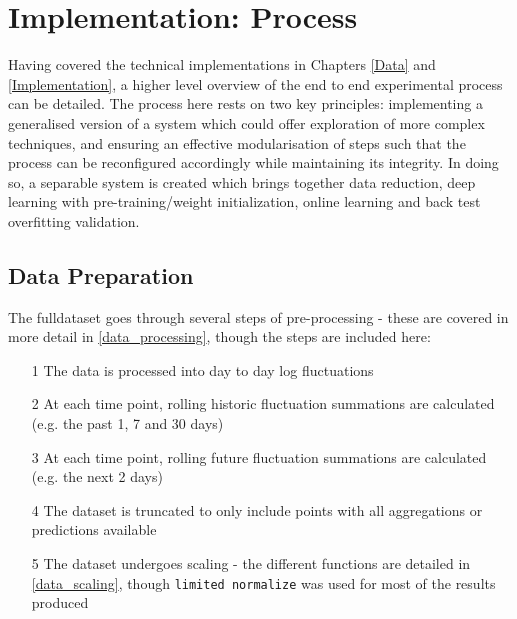 \documentclass[a4paper,11pt,oneside]{article}
\theoremstyle{plain}
\theoremstyle{definition}
\begin{document}
\newpage
\section{Implementation: Process}\label{imp_proc}

Having covered the technical implementations in Chapters \ref{Data} and \ref{Implementation}, a higher level overview of the end to end experimental process can be detailed. The process here rests on two key principles: implementing a generalised version of a system which could offer exploration of more complex techniques, and ensuring an effective modularisation of steps such that the process can be reconfigured accordingly while maintaining its integrity. In doing so, a separable system is created which brings together data reduction, deep learning with pre-training/weight initialization, online learning and back test overfitting validation.

\subsection{Data Preparation}\label{proc_dataprep}

The fulldataset goes through several steps of pre-processing - these are covered in more detail in \ref{data_processing}, though the steps are included here:

	\begin{itemize}
	\item[1] The data is processed into day to day log fluctuations
	\item[2] At each time point, rolling historic fluctuation summations are calculated (e.g. the past 1, 7 and 30 days)
	\item[3] At each time point, rolling future fluctuation summations are calculated (e.g. the next 2 days)
	\item[4] The dataset is truncated to only include points with all aggregations or predictions available
	\item[5] The dataset undergoes scaling - the different functions are detailed in \ref{data_scaling}, though \texttt{limited normalize} was used for most of the results produced
\end{itemize}
\end{document}
